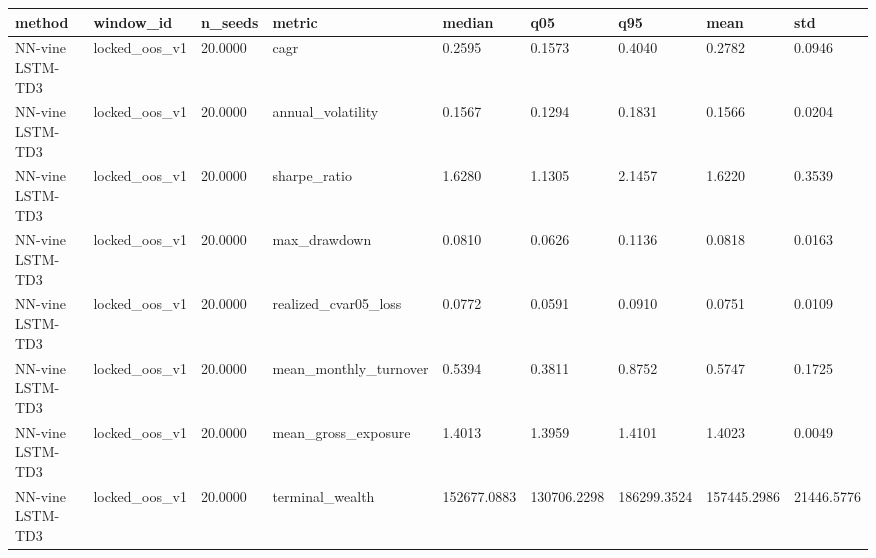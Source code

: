 \begin{tabular}{lllllllll}
\toprule
method & window\_id & n\_seeds & metric & median & q05 & q95 & mean & std \\
\midrule
NN-vine LSTM-TD3 & locked\_oos\_v1 & 20.0000 & cagr & 0.2595 & 0.1573 & 0.4040 & 0.2782 & 0.0946 \\
NN-vine LSTM-TD3 & locked\_oos\_v1 & 20.0000 & annual\_volatility & 0.1567 & 0.1294 & 0.1831 & 0.1566 & 0.0204 \\
NN-vine LSTM-TD3 & locked\_oos\_v1 & 20.0000 & sharpe\_ratio & 1.6280 & 1.1305 & 2.1457 & 1.6220 & 0.3539 \\
NN-vine LSTM-TD3 & locked\_oos\_v1 & 20.0000 & max\_drawdown & 0.0810 & 0.0626 & 0.1136 & 0.0818 & 0.0163 \\
NN-vine LSTM-TD3 & locked\_oos\_v1 & 20.0000 & realized\_cvar05\_loss & 0.0772 & 0.0591 & 0.0910 & 0.0751 & 0.0109 \\
NN-vine LSTM-TD3 & locked\_oos\_v1 & 20.0000 & mean\_monthly\_turnover & 0.5394 & 0.3811 & 0.8752 & 0.5747 & 0.1725 \\
NN-vine LSTM-TD3 & locked\_oos\_v1 & 20.0000 & mean\_gross\_exposure & 1.4013 & 1.3959 & 1.4101 & 1.4023 & 0.0049 \\
NN-vine LSTM-TD3 & locked\_oos\_v1 & 20.0000 & terminal\_wealth & 152677.0883 & 130706.2298 & 186299.3524 & 157445.2986 & 21446.5776 \\
\bottomrule
\end{tabular}
